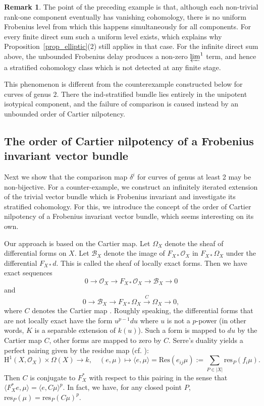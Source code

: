 \documentclass[12pt,a4]{amsart}
\theoremstyle{definition}
\newtheorem{rem}[claim]{Remark}
\begin{document}
\begin{rem}\label{rem_many_line_bundles}
The point of the preceding example is that, although each non-trivial
rank-one component eventually has vanishing cohomology, there is no uniform
Frobenius level from which this happens simultaneously for all components.
For every finite direct sum such a uniform level exists, which explains why
Proposition~\ref{prop_elliptic}(2) still applies in that case. For the infinite
direct sum above, the unbounded Frobenius delay produces a non-zero
${\varprojlim}^{1}$ term, and hence a stratified cohomology class which is not
detected at any finite stage.

This phenomenon is different from the counterexample constructed below for
curves of genus $2$. There the ind-stratified bundle lies entirely in the
unipotent isotypical component, and the failure of comparison is caused instead
by an unbounded order of Cartier nilpotency.
\end{rem}


\subsection{The order of Cartier nilpotency of a Frobenius invariant vector bundle} 
\label{sect_Cartier_nilpotency}
Next we show that the comparison map $\delta^i$ for
curves of genus at least 2 may be non-bijective. For a counter-example, we
construct an infinitely iterated extension of the trivial vector bundle which is
Frobenius invariant and investigate its stratified cohomology. For this, we
introduce the concept of the order of Cartier nilpotency of a Frobenius invariant
vector bundle, which seems interesting on its own. 

Our approach is based on the Cartier map. 
Let $\Omega_X$ denote the sheaf of  differential forms on $X$. 
Let $\mathcal B_X$ denote the image of $F_{X*}\mathcal O_X$ in $F_{X*}\Omega_X$ under the differential $F_{X*}d$. This is called the sheaf of locally exact forms. Then we have
exact sequences
$$0\longrightarrow \mathcal O_X\longrightarrow F_{X*}\mathcal O_X \longrightarrow
\mathcal B_X\longrightarrow 0$$
and
$$0\longrightarrow \mathcal B_X\longrightarrow 
F_{X*}\Omega_X\stackrel C\longrightarrow \Omega_X\longrightarrow 0,$$
where $C$ denotes the Cartier map \cite{Car57}. Roughly speaking, the differential 
forms that are not locally exact have the form $u^{p-1}du$ where $u$ is not a $p$-power
(in other words, $K$ is a separable extension of $k(u)$). Such a form is mapped to 
$du$ by the Cartier map $C$, other forms are mapped to zero by $C$.
Serre's duality yields a perfect pairing given by the residue map (cf. \cite{Ser58}):
$$\mathrm{H}^1(X,\mathcal O_X) \times \Omega(X) \longrightarrow k, \quad
(e,\mu)\longmapsto \langle e,\mu \rangle= \textrm{Res}(e_{ij} \mu):= \sum_{P\in |X|}\textrm{res}_P(f_i\mu).$$ 
Then $C$ is conjugate to $F^*_X$ with respect
to this pairing in the sense that
$\langle F^*_Xe,\mu\rangle =\langle e, C\mu\rangle ^p.$
In fact, we have, for any closed point $P$,
$\textrm{res}_P(\mu)=\textrm{res}_P(C\mu)^p.$
\end{document}
